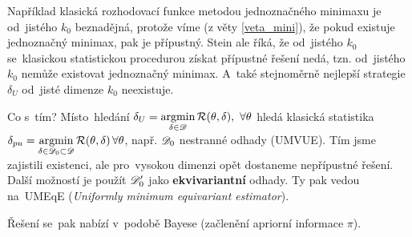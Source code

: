 \begin{dusl}
	Například klasická rozhodovací funkce metodou jednoznačného minimaxu je od~jistého $k_0$ beznadějná, protože víme (z věty \ref{veta_mini}), že pokud existuje jednoznačný minimax, pak je přípustný. Stein ale říká, že od~jistého $k_0$ se~klasickou statistickou procedurou získat přípustné řešení nedá, tzn. od~jistého $k_0$ nemůže existovat jednoznačný minimax. A~také stejnoměrně nejlepší strategie $\delta_U$ od~jisté dimenze $k_0$ neexistuje.
\end{dusl}
Co s~tím? Místo~hledání $\delta_U=\mathop{\mathrm{argmin}}\limits_{\delta\in\mathscr{D}}\mathcal{R}(\theta,\delta),~\forall\theta$ hledá klasická statistika $\delta_{pu}=\mathop{\mathrm{argmin}}\limits_{\delta\in\mathscr{D}_0\subset\mathscr{D} }\mathcal{R}(\theta,\delta)\,\forall\theta$, např. $\mathscr{D}_0$ nestranné odhady (UMVUE). Tím jsme zajistili existenci, ale pro~vysokou dimenzi opět dostaneme nepřípustné řešení. Další možností je použít $\mathscr{D}'_0$ jako \textbf{ekvivariantní} odhady. Ty pak vedou na~UMEqE (\textit{Uniformly minimum equivariant estimator}).  

Řešení se~pak nabízí v~podobě Bayese (začlenění apriorní informace $\pi$).
